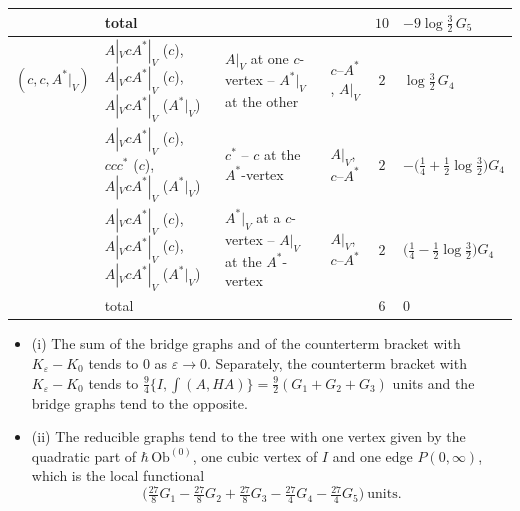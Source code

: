\begin{tabular}{l|l|l|l|c|l}
 & total & & & $10$ & $-9\log\tfrac32\,G_5$ \\
\hline
$(c,c,A^*|_V)$ & $A|_VcA^*|_V$ ($c$), $A|_VcA^*|_V$ ($c$), $A|_VcA^*|_V$ ($A^*|_V$) & $A|_V$ at one $c$-vertex -- $A^*|_V$ at the other & $c$--$A^*$, $A|_V$ & $2$ & $\log\tfrac32\,G_4$ \\
 & $A|_VcA^*|_V$ ($c$), $ccc^*$ ($c$), $A|_VcA^*|_V$ ($A^*|_V$) & $c^*$ -- $c$ at the $A^*$-vertex & $A|_V$, $c$--$A^*$ & $2$ & $-\big(\tfrac14+\tfrac12\log\tfrac32\big)G_4$ \\
 & $A|_VcA^*|_V$ ($c$), $A|_VcA^*|_V$ ($c$), $A|_VcA^*|_V$ ($A^*|_V$) & $A^*|_V$ at a $c$-vertex -- $A|_V$ at the $A^*$-vertex & $A|_V$, $c$--$A^*$ & $2$ & $\big(\tfrac14-\tfrac12\log\tfrac32\big)G_4$ \\
 & total & & & $6$ & $0$ \\
\end{tabular}

\begin{proposition}
\label{prop:c9-limits}
\begin{itemize}
\item (i) The sum of the bridge graphs and of the counterterm bracket with $K_\varepsilon-K_0$ tends to $0$ as $\varepsilon\to0$. Separately, the counterterm bracket with $K_\varepsilon-K_0$ tends to $\tfrac94\{I,\int(A,HA)\}=\tfrac92(G_1+G_2+G_3)$ units and the bridge graphs tend to the opposite.
\item (ii) The reducible graphs tend to the tree with one vertex given by the quadratic part of $\hbar\,\mathrm{Ob}^{(0)}$, one cubic vertex of $I$ and one edge $P(0,\infty)$, which is the local functional
\[
\Big(\tfrac{27}8G_1-\tfrac{27}8G_2+\tfrac{27}8G_3-\tfrac{27}4G_4-\tfrac{27}4G_5\Big)\ \text{units}.
\]
\end{itemize}
\end{proposition}

